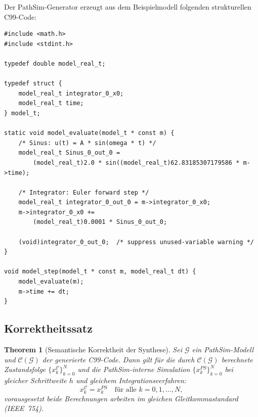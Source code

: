 ﻿\documentclass[12pt,a4paper]{article}
\newtheorem{theorem}{Theorem}[section]
\theoremstyle{definition}
\begin{document}
Der PathSim-Generator erzeugt aus dem Beispielmodell folgenden strukturellen C99-Code:

\begin{lstlisting}[style=cstyle, caption={Generierter MISRA-konformer C99-Code (vereinfacht)}]
#include <math.h>
#include <stdint.h>

typedef double model_real_t;

typedef struct {
    model_real_t integrator_0_x0;
    model_real_t time;
} model_t;

static void model_evaluate(model_t * const m) {
    /* Sinus: u(t) = A * sin(omega * t) */
    model_real_t Sinus_0_out_0 =
        (model_real_t)2.0 * sin((model_real_t)62.83185307179586 * m->time);

    /* Integrator: Euler forward step */
    model_real_t integrator_0_out_0 = m->integrator_0_x0;
    m->integrator_0_x0 +=
        (model_real_t)0.0001 * Sinus_0_out_0;

    (void)integrator_0_out_0;  /* suppress unused-variable warning */
}

void model_step(model_t * const m, model_real_t dt) {
    model_evaluate(m);
    m->time += dt;
}
\end{lstlisting}

\subsection{Korrektheitssatz}

\begin{theorem}[Semantische Korrektheit der Synthese]
\label{thm:correct}
Sei $\mathcal{G}$ ein PathSim-Modell und $\mathcal{C}(\mathcal{G})$ der
generierte C99-Code. Dann gilt für die durch $\mathcal{C}(\mathcal{G})$
berechnete Zustandsfolge $\{x_k^\mathcal{C}\}_{k=0}^N$ und die PathSim-interne
Simulation $\{x_k^{PS}\}_{k=0}^N$ bei gleicher Schrittweite $h$ und gleichem
Integrationsverfahren:
\[
  x_k^\mathcal{C} = x_k^{PS} \quad \text{für alle } k = 0, 1, \ldots, N,
\]
vorausgesetzt beide Berechnungen arbeiten im gleichen Gleitkommastandard (IEEE~754).
\end{theorem}
\end{document}
